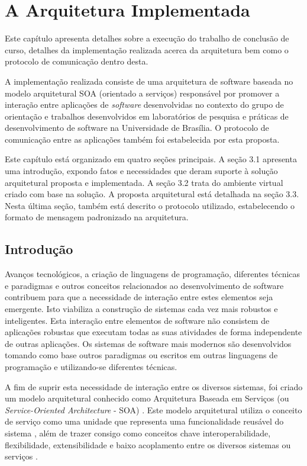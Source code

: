 \chapter[A Arquitetura Implementada]{A Arquitetura Implementada}

Este capítulo apresenta detalhes sobre a execução do trabalho de conclusão de curso, detalhes da implementação realizada acerca da arquitetura bem como o protocolo de comunicação dentro desta.

A implementação realizada consiste de uma arquitetura de software baseada no modelo arquitetural SOA (orientado a serviços) responsável por promover a interação entre aplicações de \textit{software} desenvolvidas no contexto do grupo de orientação e trabalhos desenvolvidos em laboratórios de pesquisa e práticas de desenvolvimento de software na Universidade de Brasília. O protocolo de comunicação entre as aplicações também foi estabelecida por esta proposta.

Este capítulo está organizado em quatro seções principais. A seção 3.1 apresenta uma introdução, expondo fatos e necessidades que deram suporte à solução arquitetural proposta e implementada. A seção 3.2 trata do ambiente virtual criado com base na solução. A proposta arquitetural está detalhada na seção 3.3. Nesta última seção, também está descrito o protocolo utilizado, estabelecendo o formato de mensagem padronizado na arquitetura.

\section{Introdução}
Avanços tecnológicos, a criação de linguagens de programação, diferentes técnicas e paradigmas e outros conceitos relacionados ao desenvolvimento de software contribuem para que a necessidade de interação entre estes elementos seja emergente. Isto viabiliza a construção de sistemas cada vez mais robustos e inteligentes. Esta interação entre elementos de software não consistem de aplicações robustas que executam todas as suas atividades de forma independente de outras aplicações. Os sistemas de software mais modernos são desenvolvidos tomando como base outros paradigmas ou escritos em outras linguagens de programação e utilizando-se diferentes técnicas.

A fim de suprir esta necessidade de interação entre os diversos sistemas, foi criado um modelo arquitetural conhecido como Arquitetura Baseada em Serviços (ou \textit{Service-Oriented Architecture} - SOA) \cite{linthicum_soainrealworld_2007}. Este modelo arquitetural utiliza o conceito de serviço como uma unidade que representa uma funcionalidade reusável do sistema \cite{lewis_getting_2010}, além de trazer consigo como conceitos chave interoperabilidade, flexibilidade, extensibilidade e baixo acoplamento entre os diversos sistemas ou serviços \cite{josuttis_soa_2007}.

